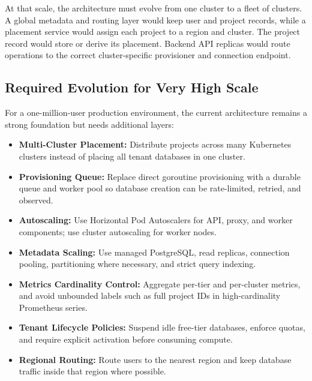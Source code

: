 At that scale, the architecture must evolve from one cluster to a fleet of clusters. A global metadata and routing layer would keep user and project records, while a placement service would assign each project to a region and cluster. The project record would store or derive its placement. Backend API replicas would route operations to the correct cluster-specific provisioner and connection endpoint.

\subsection{Required Evolution for Very High Scale}

For a one-million-user production environment, the current architecture remains a strong foundation but needs additional layers:

\begin{itemize}
    \item \textbf{Multi-Cluster Placement:} Distribute projects across many Kubernetes clusters instead of placing all tenant databases in one cluster.
    \item \textbf{Provisioning Queue:} Replace direct goroutine provisioning with a durable queue and worker pool so database creation can be rate-limited, retried, and observed.
    \item \textbf{Autoscaling:} Use Horizontal Pod Autoscalers for API, proxy, and worker components; use cluster autoscaling for worker nodes.
    \item \textbf{Metadata Scaling:} Use managed PostgreSQL, read replicas, connection pooling, partitioning where necessary, and strict query indexing.
    \item \textbf{Metrics Cardinality Control:} Aggregate per-tier and per-cluster metrics, and avoid unbounded labels such as full project IDs in high-cardinality Prometheus series.
    \item \textbf{Tenant Lifecycle Policies:} Suspend idle free-tier databases, enforce quotas, and require explicit activation before consuming compute.
    \item \textbf{Regional Routing:} Route users to the nearest region and keep database traffic inside that region where possible.
\end{itemize}

